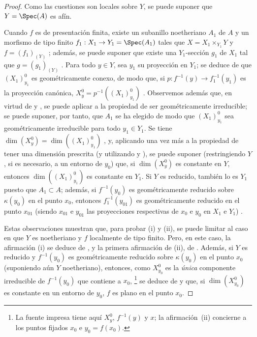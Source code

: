 \begin{proof}
Como las cuestiones son locales sobre $Y$, se puede suponer que $Y=\Spec(A)$ es afín.

Cuando $f$ es de presentación finita, existe un subanillo noetheriano $A_1$ de $A$ y un morfismo de tipo finito $f_1:X_1\to Y_1=\Spec(A_1)$ tales que $X=X_1\times_{Y_1}Y$ y $f=(f_1)_{(Y)}$ ; además, se puede suponer que existe una $Y_1$-sección $g_1$ de $X_1$ tal que $g=(g_1)_{(Y)}$ .
Para todo $y\in Y$, sea $y_1$ su proyección en $Y_1$; se deduce de  que $(X_1)_{y_1}^0$ es geométricamente conexo, de modo que, si $p:f^{-1}(y)\to f_1^{-1}(y_1)$ es la proyección canónica, $X_y^0=p^{-1}((X_1)_{y_1}^0)$ .
Observemos además que, en virtud de  y , se puede aplicar  a la propiedad de ser geométricamente irreducible; se puede suponer, por tanto, que $A_1$ se ha elegido de modo que $(X_1)_{y_1}^0$ sea geométricamente irreducible para todo $y_1\in Y_1$.
Se tiene $\dim(X_y^0)=\dim((X_1)_{y_1}^0)$ , y, aplicando una vez más  a la propiedad de tener una dimensión prescrita (y utilizando  y ), se puede suponer (restringiendo $Y$, si es necesario, a un entorno de $y_0$) que, si $\dim(X_y^0)$ es constante en $Y$, entonces $\dim((X_1)_{y_1}^0)$ es constante en $Y_1$.
Si $Y$ es reducido, también lo es $Y_1$ puesto que $A_1\subset A$; además, si $f^{-1}(y_0)$ es geométricamente reducido sobre $\kappa(y_0)$ en el punto $x_0$, entonces $f_1^{-1}(y_{01})$ es geométricamente reducido en el punto $x_{01}$ (siendo $x_{01}$ e $y_{01}$ las proyecciones respectivas de $x_0$ e $y_0$ en $X_1$ e $Y_1$) .

Estas observaciones muestran que, para probar (i) y (ii), se puede limitar al caso en que $Y$ es noetheriano y $f$ localmente de tipo finito.
Pero, en este caso, la afirmación (i) se deduce de , y la primera afirmación de (ii), de .
Además, si $Y$ es reducido y $f^{-1}(y_0)$ es geométricamente reducido sobre $\kappa(y_0)$ en el punto $x_0$ (suponiendo aún $Y$ noetheriano), entonces, como $X_{y_0}^0$ es la \emph{única} componente irreducible de $f^{-1}(y_0)$ que contiene a $x_0$,
\footnote{La fuente impresa tiene aquí $X_y^0$, $f^{-1}(y)$ y $x$; la afirmación~(ii) concierne a los puntos fijados $x_0$ e $y_0=f(x_0)$.} se
deduce de  y  que, si $\dim(X_{y_0}^0)$ es constante en un entorno de $y_0$, $f$ es plano en el punto $x_0$.


\end{proof}
